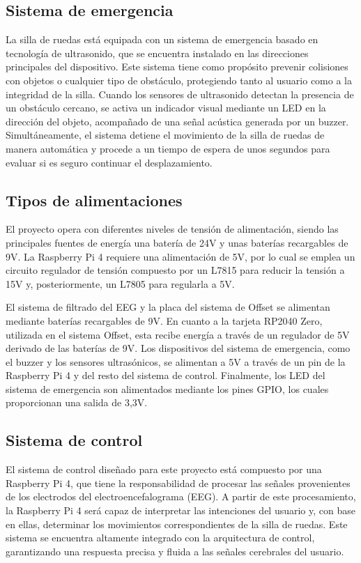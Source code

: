 \documentclass{article}
\begin{document}
\subsection{Sistema de emergencia}

La silla de ruedas está equipada con un sistema de emergencia basado en tecnología de ultrasonido, que se encuentra instalado en las direcciones principales del dispositivo. Este sistema tiene como propósito prevenir colisiones con objetos o cualquier tipo de obstáculo, protegiendo tanto al usuario como a la integridad de la silla. Cuando los sensores de ultrasonido detectan la presencia de un obstáculo cercano, se activa un indicador visual mediante un LED en la dirección del objeto, acompañado de una señal acústica generada por un buzzer. Simultáneamente, el sistema detiene el movimiento de la silla de ruedas de manera automática y procede a un tiempo de espera de unos segundos para evaluar si es seguro continuar el desplazamiento.

\subsection{Tipos de alimentaciones}

El proyecto opera con diferentes niveles de tensión de alimentación, siendo las principales fuentes de energía una batería de 24V y unas baterías recargables de 9V. La Raspberry Pi 4 requiere una alimentación de 5V, por lo cual se emplea un circuito regulador de tensión compuesto por un L7815 para reducir la tensión a 15V y, posteriormente, un L7805 para regularla a 5V.

El sistema de filtrado del EEG y la placa del sistema de Offset se alimentan mediante baterías recargables de 9V. En cuanto a la tarjeta RP2040 Zero, utilizada en el sistema Offset, esta recibe energía a través de un regulador de 5V derivado de las baterías de 9V. Los dispositivos del sistema de emergencia, como el buzzer y los sensores ultrasónicos, se alimentan a 5V a través de un pin de la Raspberry Pi 4 y del resto del sistema de control. Finalmente, los LED del sistema de emergencia son alimentados mediante los pines GPIO, los cuales proporcionan una salida de 3,3V.

\subsection{Sistema de control}

El sistema de control diseñado para este proyecto está compuesto por una Raspberry Pi 4, que tiene la responsabilidad de procesar las señales provenientes de los electrodos del electroencefalograma (EEG). A partir de este procesamiento, la Raspberry Pi 4 será capaz de interpretar las intenciones del usuario y, con base en ellas, determinar los movimientos correspondientes de la silla de ruedas. Este sistema se encuentra altamente integrado con la arquitectura de control, garantizando una respuesta precisa y fluida a las señales cerebrales del usuario.
\end{document}
